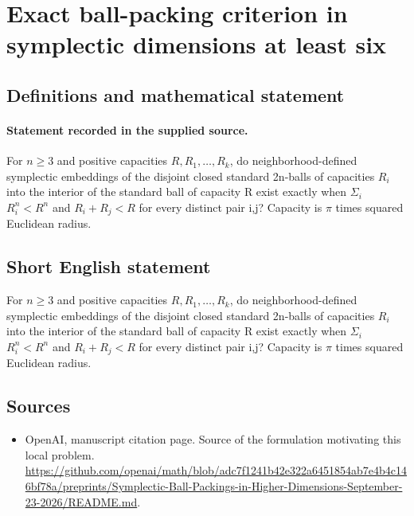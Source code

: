 \documentclass[11pt]{article}
\begin{document}
\section*{Exact ball-packing criterion in symplectic dimensions at least six}\label{30007143}
\subsection{Definitions and mathematical statement}
\paragraph{Statement recorded in the supplied source.}
For $n\geq 3$ and positive capacities $R,R_{1},\dots ,R_k$, do neighborhood-defined symplectic embeddings of the disjoint closed standard 2n-balls of capacities $R_i$ into the interior of the standard ball of capacity R exist exactly when $\Sigma _i$ $R_i^{n}<R^{n}$ and $R_i+R_j<R$ for every distinct pair i,j? Capacity is $\pi $ times squared Euclidean radius.
\subsection{Short English statement}
For $n\geq 3$ and positive capacities $R,R_{1},\dots ,R_k$, do neighborhood-defined symplectic embeddings of the disjoint closed standard 2n-balls of capacities $R_i$ into the interior of the standard ball of capacity R exist exactly when $\Sigma _i$ $R_i^{n}<R^{n}$ and $R_i+R_j<R$ for every distinct pair i,j? Capacity is $\pi $ times squared Euclidean radius.
\subsection{Sources}
\begin{itemize}
\item[S1] OpenAI, manuscript citation page. Source of the formulation motivating this local problem.
\url{https://github.com/openai/math/blob/adc7f1241b42e322a6451854ab7e4b4c146bf78a/preprints/Symplectic-Ball-Packings-in-Higher-Dimensions-September-23-2026/README.md}.
\end{itemize}
\end{document}
